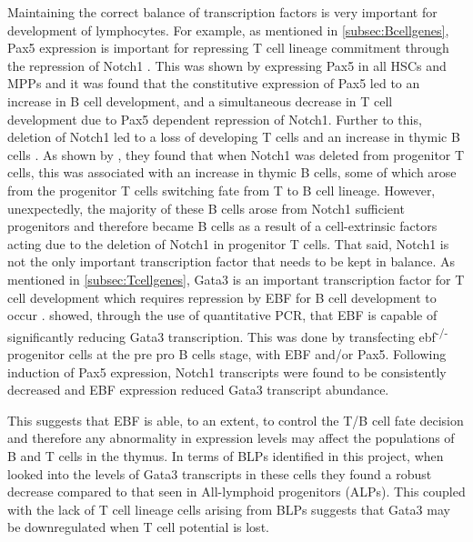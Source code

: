 Maintaining the correct balance of transcription factors is very important for development of lymphocytes. 
For example, as mentioned in \cref{subsec:Bcellgenes}, Pax5 expression is important for repressing T cell lineage commitment through the repression of Notch1 \citep{Souabni2002}.
This was shown by expressing Pax5 in all HSCs and MPPs and it was found that the constitutive expression of Pax5 led to an increase in B cell development, and a simultaneous decrease in T cell development due to Pax5 dependent repression of Notch1.
Further to this, deletion of Notch1 led to a loss of developing T cells and an increase in thymic B cells \citep{Feyerabend2009}.
As shown by \citet{Feyerabend2009}, they found that when Notch1 was deleted from progenitor T cells, this was associated with an increase in thymic B cells, some of which arose from the progenitor T cells switching fate from T to B cell lineage.
However, unexpectedly, the majority of these B cells arose from Notch1 sufficient progenitors and therefore became B cells as a result of a cell-extrinsic factors acting due to the deletion of Notch1 in progenitor T cells.
That said, Notch1 is not the only important transcription factor that needs to be kept in balance.
As mentioned in \cref{subsec:Tcellgenes}, Gata3 is an important transcription factor for T cell development which requires repression by EBF for B cell development to occur \citep{Banerjee2013}.
\citet{Banerjee2013} showed, through the use of quantitative PCR, that EBF is capable of significantly reducing Gata3 transcription.
This was done by transfecting ebf\textsuperscript{-/-} progenitor cells at the pre pro B cells stage, with EBF and/or Pax5.
Following induction of Pax5 expression, Notch1 transcripts were found to be consistently decreased and EBF expression reduced Gata3 transcript abundance.

This suggests that EBF is able, to an extent, to control the T/B cell fate decision and therefore any abnormality in expression levels may affect the populations of B and T cells in the thymus.
In terms of BLPs identified in this project, when \citet{Banerjee2013} looked into the levels of Gata3 transcripts in these cells they found a robust decrease compared to that seen in All-lymphoid progenitors (ALPs).
This coupled with the lack of T cell lineage cells arising from BLPs suggests that Gata3 may be downregulated when T cell potential is lost.

